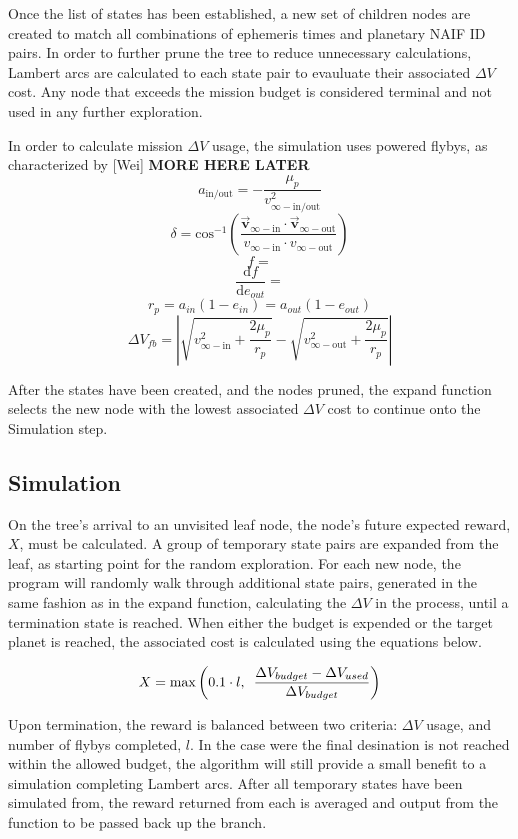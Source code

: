 \documentclass[letterpaper, preprint, paper,11pt]{AAS}	%
\begin{document}
Once the list of states has been established, a new set of children nodes are created to match all combinations of ephemeris times and planetary NAIF ID pairs. In order to further prune the tree to reduce unnecessary calculations, Lambert arcs are calculated to each state pair to evauluate their associated $\Delta V$ cost. Any node that exceeds the mission budget is considered terminal and not used in any further exploration.

In order to calculate mission $\Delta V$ usage, the simulation uses powered flybys, as characterized by [Wei] \textbf{MORE HERE LATER}
\[ a_\text{in/out} = -\frac{\mu_p}{v^2_{\infty-\text{in/out}}} \]
\[ \delta = \text{cos}^{-1}\left(\frac{ \vec{\textbf{v}}_{\infty-\text{in}} \cdot \vec{\textbf{v}}_{\infty-\text{out}} }{ v_{\infty-\text{in}} \cdot v_{\infty-\text{out}} }\right) \]
\[ f =  \]
\[ \frac{\text{d}f}{\text{d}e_{out}} =  \]
\[ r_p = a_{in}(1 - e_{in}) = a_{out}(1 - e_{out}) \]
\[ \Delta V_{fb} = \left| \sqrt{v^2_{\infty-\text{in}} + \frac{2\mu_p}{r_p}} - \sqrt{v^2_{\infty-\text{out}} + \frac{2\mu_p}{r_p}} \right| \]

After the states have been created, and the nodes pruned, the expand function selects the new node with the lowest associated $\Delta V$ cost to continue onto the Simulation step.

\subsection{Simulation}

On the tree's arrival to an unvisited leaf node, the node's future expected reward, $X$, must be calculated. A group of temporary state pairs are expanded from the leaf, as starting point for the random exploration. For each new node, the program will randomly walk through additional state pairs, generated in the same fashion as in the expand function, calculating the $\Delta V$ in the process, until a termination state is reached. When either the budget is expended or the target planet is reached, the associated cost is calculated using the equations below.

\begin{equation}
    \label{eq:simCost1}
    X = \text{max}\left( 0.1 \cdot l,\hspace{0.5em} \frac{\Delta V_{budget} - \Delta V_{used}}{\Delta V_{budget}} \right)
\end{equation}

Upon termination, the reward is balanced between two criteria: $\Delta V$ usage, and number of flybys completed, $l$. In the case were the final desination is not reached within the allowed budget, the algorithm will still provide a small benefit to a simulation completing Lambert arcs. After all temporary states have been simulated from, the reward returned from each is averaged and output from the function to be passed back up the branch.
\end{document}
